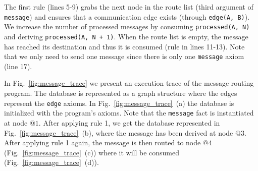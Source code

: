 The first rule (lines 5-9) grabs the next node in the route list (third argument of \texttt{message}) and
ensures that a communication edge exists (through \texttt{edge(A,~B)}). We increase the number of
processed messages by consuming \texttt{processed(A,~N)} and deriving \texttt{processed(A,~N~+~1)}.
When the route list is empty, the message has reached its destination and thus it is consumed
(rule in lines 11-13).
Note that we only need to send one message since there is only one \texttt{message} axiom (line 17).

In Fig.~\ref{fig:message_trace} we present an execution trace of the message routing program.
The database is represented as a graph structure where the edges represent the \texttt{edge}
axioms. 
In Fig.~\ref{fig:message_trace}~(a) the database is initialized with the program's axioms. Note that
the \texttt{message} fact is instantiated at node $@1$. After applying rule 1, we get the database represented
in Fig.~\ref{fig:message_trace}~(b), where the message has been derived at node $@3$. After applying rule 1 again,
the message is then routed to node $@4$ (Fig.~\ref{fig:message_trace}~(c)) where it will be consumed (Fig.~\ref{fig:message_trace}~(d)).


